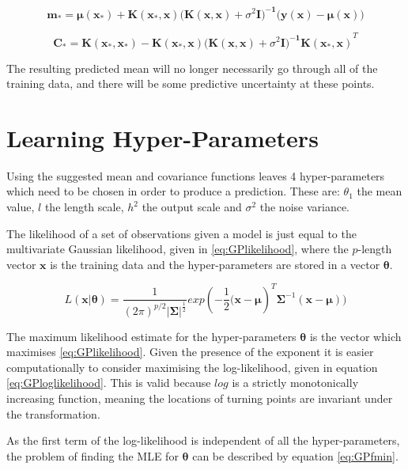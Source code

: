 \documentclass[a4paper,11pt]{report}
\begin{document}
\singlespacing


\begin{equation} \label{eq:GP+noisemean}
\mathbf{m_*} = \boldsymbol{\mu} \mathbf{(x_*) + K(x_* ,x) (K(x,x)}+\sigma^2 \mathbf{I)^{-1} (y(x)} - \boldsymbol{\mu} \mathbf{(x))}
\end{equation}

\begin{equation} \label{eq:GP+noisevar}
\mathbf{ C_* = K(x_*,x_*)-K(x_*,x) (K(x,x)}+\sigma^2 \mathbf{I)^{-1} K(x_*,x)}^{T}
\end{equation}

\doublespacing

The resulting predicted mean will no longer necessarily go through all of the training data, and there will be some predictive uncertainty at these points.

\section{Learning Hyper-Parameters}
Using the suggested mean and covariance functions leaves 4 hyper-parameters which need to be chosen in order to produce a prediction. These are: \(\theta_1\) the mean value, \(l\) the length scale, \(h^2\) the output scale and \(\sigma^2\) the noise variance. 

The likelihood of a set of observations given a model is just equal to the multivariate Gaussian likelihood, given in \ref{eq:GPlikelihood}, where the \(p\)-length vector \(\mathbf{x}\) is the training data and the hyper-parameters are stored in a vector \(\mathbf{\theta}\).

\begin{equation} \label{eq:GPlikelihood}
L(\mathbf{x | \theta}) = \frac{1}{(2\pi)^{p/2} |\boldsymbol{\Sigma|}^{\frac{1}{2}}} exp(- \frac{1}{2} \mathbf{(x}-\boldsymbol{\mu})^{T}\boldsymbol{\Sigma}^{-1}(\mathbf{x}-\boldsymbol{\mu}))
\end{equation}

The maximum likelihood estimate for the hyper-parameters \(\mathbf{\theta}\) is the vector which maximises \ref{eq:GPlikelihood}. Given the presence of the exponent it is easier computationally to consider maximising the log-likelihood, given in equation \ref{eq:GPloglikelihood}. This is valid because \(log\) is a strictly monotonically increasing function, meaning the locations of turning points are invariant under the transformation. \par
As the first term of the log-likelihood is independent of all the hyper-parameters, the problem of finding the MLE for \(\boldsymbol{\theta}\) can be described by equation \ref{eq:GPfmin}.
\end{document}
